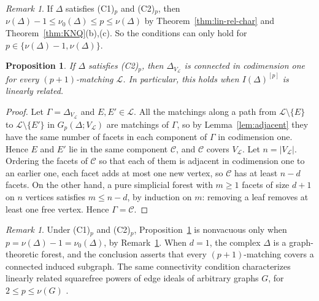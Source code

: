 \documentclass{amsart}
\newtheorem{Proposition}[Theorem]{Proposition}
\theoremstyle{definition}
\theoremstyle{remark}
\newtheorem{Remark}[Theorem]{Remark}
\begin{document}
\begin{Remark}\label{rem:consequences}
If $\Delta$ satisfies (C1)$_p$ and (C2)$_p$, then $\nu(\Delta)-1\leq\nu_0(\Delta)\leq p\leq\nu(\Delta)$ by Theorem~\ref{thm:lin-rel-char} and Theorem~\ref{thm:KNQ}(b),(c). So the conditions can only hold for $p\in\{\nu(\Delta)-1,\nu(\Delta)\}$.
\end{Remark}


\begin{Proposition}\label{prop:C2}
If $\Delta$ satisfies \textnormal{(C2)$_p$}, then $\Delta_{V_{\mathcal L}}$ is connected in codimension one for every $(p+1)$-matching $\mathcal L$. In particular, this holds when $I(\Delta)^{[p]}$ is linearly related.
\end{Proposition}

\begin{proof}
Let $\Gamma=\Delta_{V_{\mathcal L}}$ and $E,E'\in\mathcal L$. All the matchings along a path from $\mathcal L\setminus\{E\}$ to $\mathcal L\setminus\{E'\}$ in $G_p(\Delta;V_{\mathcal L})$ are matchings of $\Gamma$, so by Lemma~\ref{lem:adjacent} they have the same number of facets in each component of $\Gamma$ in codimension one. Hence $E$ and $E'$ lie in the same component $\mathcal C$, and $\mathcal C$ covers $V_{\mathcal L}$. Let $n=|V_{\mathcal L}|$. Ordering the facets of $\mathcal C$ so that each of them is adjacent in codimension one to an earlier one, each facet adds at most one new vertex, so $\mathcal C$ has at least $n-d$ facets. On the other hand, a pure simplicial forest with $m\geq 1$ facets of size $d+1$ on $n$ vertices satisfies $m\leq n-d$, by induction on $m$: removing a leaf removes at least one free vertex. Hence $\Gamma=\mathcal C$.
\end{proof}



\begin{Remark}\label{rem:NQT}
Under \textnormal{(C1)$_p$} and \textnormal{(C2)$_p$},
Proposition~\ref{prop:C2} is nonvacuous only when
$p=\nu(\Delta)-1=\nu_0(\Delta)$, by Remark~\ref{rem:consequences}.
When $d=1$, the complex $\Delta$ is a graph-theoretic forest, and
the conclusion asserts that every $(p+1)$-matching covers a connected
induced subgraph. The same connectivity condition characterizes
linearly related squarefree powers of edge ideals of arbitrary graphs
$G$, for $2\leq p\leq\nu(G)$
\cite[Theorem~3.1]{NQT26}.
\end{Remark}
\end{document}
